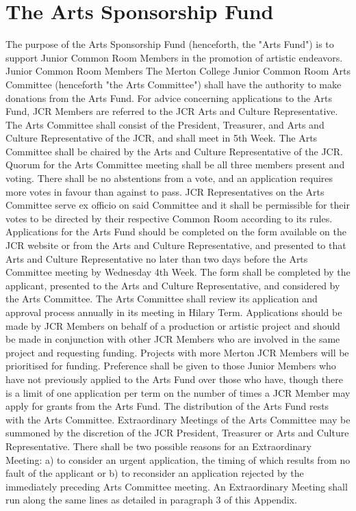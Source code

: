 \section{The Arts Sponsorship Fund} \label{AppSec:ArtsFund}
\npara The purpose of the Arts Sponsorship Fund (henceforth, the "Arts Fund") is to support Junior Common Room Members in the promotion of artistic endeavors. Junior Common Room Members   
\npara The Merton College Junior Common Room Arts Committee (henceforth "the Arts Committee") shall have the authority to make donations from the Arts Fund. For advice concerning applications to the Arts Fund, JCR Members are referred to the JCR Arts and Culture Representative.   
\npara The Arts Committee shall consist of the President, Treasurer, and Arts and Culture Representative of the JCR, and shall meet in 5th Week. The Arts Committee shall be chaired by the Arts and Culture Representative of the JCR. Quorum for the Arts Committee meeting shall be all three members present and voting. There shall be no abstentions from a vote, and an application requires more votes in favour than against to pass. JCR Representatives on the Arts Committee serve ex officio on said Committee and it shall be permissible for their votes to be directed by their respective Common Room according to its rules.   
\npara Applications for the Arts Fund should be completed on the form available on the JCR website or from the Arts and Culture Representative, and presented to that Arts and Culture Representative no later than two days before the Arts Committee meeting by Wednesday 4th Week. The form shall be completed by the applicant, presented to the Arts and Culture Representative, and considered by the Arts Committee. The Arts Committee shall review its application and approval process annually in its meeting in Hilary Term.   
\npara Applications should be made by JCR Members on behalf of a production or artistic project and should be made in conjunction with other JCR Members who are involved in the same project and requesting funding. Projects with more Merton JCR Members will be prioritised for funding. Preference shall be given to those Junior Members who have not previously applied to the Arts Fund over those who have, though there is a limit of one application per term on the number of times a JCR Member may apply for grants from the Arts Fund. The distribution of the Arts Fund rests with the Arts Committee.   
\npara Extraordinary Meetings of the Arts Committee may be summoned by the discretion of the JCR President, Treasurer or Arts and Culture Representative. There shall be two possible reasons for an Extraordinary Meeting: a) to consider an urgent application, the timing of which results from no fault of the applicant or b) to reconsider an application rejected by the immediately preceding Arts Committee meeting. An Extraordinary Meeting shall run along the same lines as detailed in paragraph 3 of this Appendix.   
